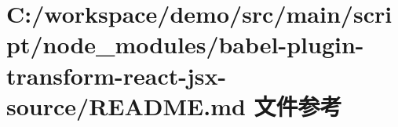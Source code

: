 \hypertarget{node__modules_2babel-plugin-transform-react-jsx-source_2_r_e_a_d_m_e_8md}{}\section{C\+:/workspace/demo/src/main/script/node\+\_\+modules/babel-\/plugin-\/transform-\/react-\/jsx-\/source/\+R\+E\+A\+D\+ME.md 文件参考}
\label{node__modules_2babel-plugin-transform-react-jsx-source_2_r_e_a_d_m_e_8md}
